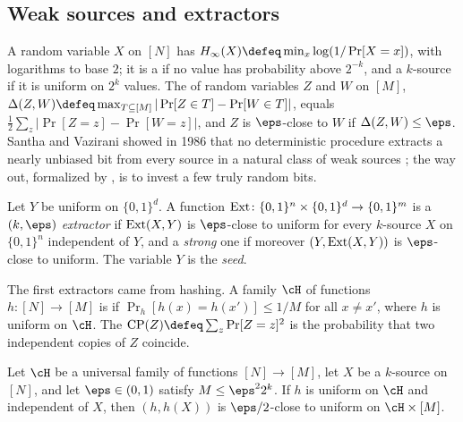 \begin{refsection}
\subsection{Weak sources and extractors}\label{sec:pseudorandom:extractors}

A random variable $X$ on $[N]$ has  $\pseudorandomHmin(X)\defeq\min_x\log(1/\Pr[X=x])$, with logarithms to base $2$; it is a  if no value has probability above $2^{-k}$, and a  $k$-source if it is uniform on $2^k$ values. The  of random variables $Z$ and $W$ on $[M]$, $\Delta(Z,W)\defeq\max_{T\subseteq[M]}|\Pr[Z\in T]-\Pr[W\in T]|$, equals $\frac12\sum_z|\Pr[Z=z]-\Pr[W=z]|$, and $Z$ is $\eps$-close to $W$ if $\Delta(Z,W)\le\eps$. Santha and Vazirani showed in 1986 that no deterministic procedure extracts a nearly unbiased bit from every source in a natural class of weak sources \parencite[\S6.5]{Vadhan2012}; the way out, formalized by \textcite{NisanZuckerman1996}, is to invest a few truly random bits.

\begin{definition}[Extractor]\label{def:pseudorandom:extractor}
Let $Y$ be uniform on $\{0,1\}^d$. A function $\operatorname{Ext}\colon\{0,1\}^n\times\{0,1\}^d\to\{0,1\}^m$ is a \emph{$(k,\eps)$ extractor} if $\operatorname{Ext}(X,Y)$ is $\eps$-close to uniform for every $k$-source $X$ on $\{0,1\}^n$ independent of $Y$, and a \emph{strong} one if moreover $(Y,\operatorname{Ext}(X,Y))$ is $\eps$-close to uniform. The variable $Y$ is the \emph{seed}.
\end{definition}

The first extractors came from hashing. A family $\cH$ of functions $h\colon[N]\to[M]$ is  if $\Pr_h[h(x)=h(x')]\le1/M$ for all $x\ne x'$, where $h$ is uniform on $\cH$. The  $\pseudorandomCP(Z)\defeq\sum_z\Pr[Z=z]^2$ is the probability that two independent copies of $Z$ coincide.

\begin{theorem}\label{thm:pseudorandom:lhl}
Let $\cH$ be a universal family of functions $[N]\to[M]$, let $X$ be a $k$-source on $[N]$, and let $\eps\in(0,1)$ satisfy $M\le\eps^22^k$. If $h$ is uniform on $\cH$ and independent of $X$, then $(h,h(X))$ is $\eps/2$-close to uniform on $\cH\times[M]$.
\end{theorem}


\end{refsection}
